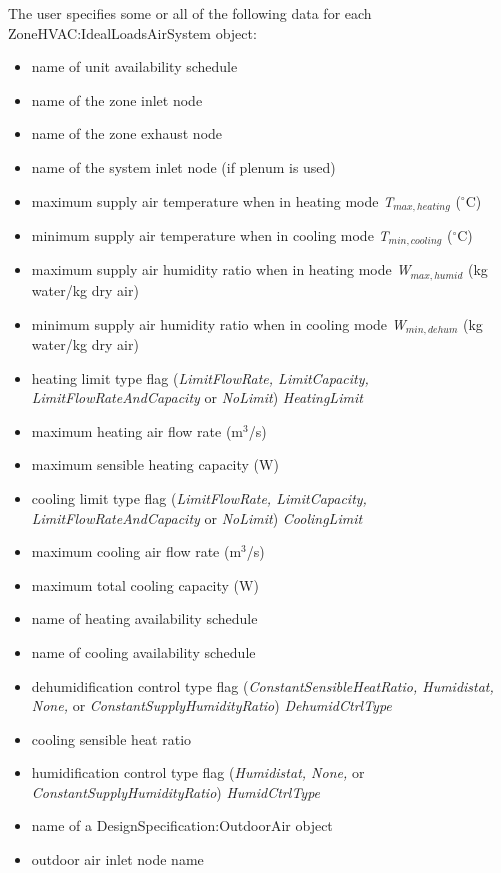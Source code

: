 The user specifies some or all of the following data for each ZoneHVAC:IdealLoadsAirSystem object:

\begin{itemize}
  \item name of unit availability schedule
  \item name of the zone inlet node
  \item name of the zone exhaust node
  \item name of the system inlet node (if plenum is used)
  \item maximum supply air temperature when in heating mode \emph{T\(_{max,heating}\)} (\(^{\circ}\)C)
  \item minimum supply air temperature when in cooling mode \emph{T\(_{min,cooling}\)} (\(^{\circ}\)C)
  \item maximum supply air humidity ratio when in heating mode \emph{W\(_{max,humid}\)} (kg water/kg dry air)
  \item minimum supply air humidity ratio when in cooling mode \emph{W\(_{min,dehum}\)} (kg water/kg dry air)
  \item heating limit type flag (\emph{LimitFlowRate, LimitCapacity, LimitFlowRateAndCapacity} or \emph{NoLimit}) \emph{HeatingLimit}
  \item maximum heating air flow rate (m\(^{3}\)/s)
  \item maximum sensible heating capacity (W)
  \item cooling limit type flag (\emph{LimitFlowRate, LimitCapacity, LimitFlowRateAndCapacity} or \emph{NoLimit}) \emph{CoolingLimit}
  \item maximum cooling air flow rate (m\(^{3}\)/s)
  \item maximum total cooling capacity (W)
  \item name of heating availability schedule
  \item name of cooling availability schedule
  \item dehumidification control type flag (\emph{ConstantSensibleHeatRatio, Humidistat, None,} or \emph{ConstantSupplyHumidityRatio}) \emph{DehumidCtrlType}
  \item cooling sensible heat ratio
  \item humidification control type flag (\emph{Humidistat, None,} or \emph{ConstantSupplyHumidityRatio}) \emph{HumidCtrlType}
  \item name of a DesignSpecification:OutdoorAir object
  \item outdoor air inlet node name

\end{itemize}
